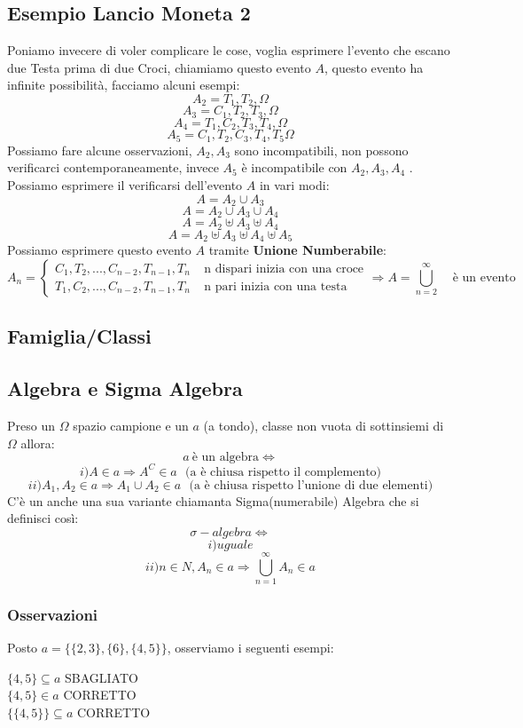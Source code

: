 \subsection{Esempio Lancio Moneta 2}
Poniamo invecere di voler complicare le cose, voglia esprimere l'evento che escano due Testa prima di due Croci, chiamiamo questo evento $A$, questo evento ha infinite possibilità, facciamo alcuni esempi:
$$ A_2 = T_1, T_2, \Omega $$
$$ A_3 = C_1, T_2, T_3, \Omega $$
$$ A_4 = T_1, C_2, T_3, T_4, \Omega $$
$$ A_5 = C_1, T_2, C_3, T_4, T_5 \Omega $$
Possiamo fare alcune osservazioni, $A_2, A_3$ sono incompatibili, non possono verificarci contemporaneamente, invece $A_5$ è incompatibile con $A_2,A_3,A_4$ .
Possiamo esprimere il verificarsi dell'evento $A$ in vari modi:\\
$$ A = A_2 \cup A_3 $$
$$ A = A_2 \cup A_3 \cup A_4 $$
$$ A = A_2 \uplus A_3  \uplus A_4 $$
$$ A = A_2 \uplus A_3 \uplus A_4 \uplus A_5 $$
Possiamo esprimere questo evento $A$ tramite \textbf{Unione Numberabile}:
\begin{equation*}
A_n =
\begin{cases}
C_1,T_2,...,C_{n-2},T_{n-1},T_n  \:\:\:\:\:\text{n dispari inizia con una croce}\\
T_1,C_2,...,C_{n-2},T_{n-1},T_n  \:\:\:\:\:\text{n pari inizia con una testa}
\end{cases}
\Rightarrow A = \bigcup_{n=2}^{\infty} \:\:\:\:\: \text{è un evento}
\end{equation*}

\subsection{Famiglia/Classi}
\blindtext

\subsection{Algebra e Sigma Algebra}
Preso un $\Omega$ spazio campione e un $a$ (a tondo), classe non vuota di sottinsiemi di $\Omega$ allora:
$$ a \: \text{è un algebra} \Leftrightarrow $$
$$ i) A \in a \Rightarrow A^C \in a \:\:\: \text{(a è chiusa rispetto il complemento)} $$
$$ ii) A_1, A_2 \in a \Rightarrow A_1 \cup A_2 \in a \:\:\: \text{(a è chiusa rispetto l'unione di due elementi)} $$
C'è un anche una sua variante chiamanta Sigma(numerabile) Algebra che si definisci così:
$$ \sigma-algebra \Leftrightarrow $$
$$ i)uguale $$
$$ ii) n \in N, A_n \in a \Rightarrow \bigcup_{n=1}^{\infty} A_n \in a$$
\subsubsection{Osservazioni}
Posto $a=\{\{2,3\}, \{6\}, \{4,5\}\}$, osserviamo i seguenti esempi:
\begin{center}
$ \{4,5\} \subseteq a $ SBAGLIATO\\
$ \{4,5\} \in a $ CORRETTO\\
$ \{\{4,5\}\} \subseteq a $ CORRETTO
\end{center}

